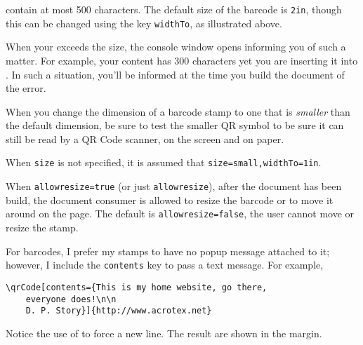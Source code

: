\documentclass{article}
\begin{document}
\begin{description}
\begin{itemize}
                contain at most 500
                characters.
                The default size of the barcode is
                \texttt{2in}, though this can be changed using
                the key \texttt{widthTo}, as illustrated above.
    \end{itemize}
    When your  exceeds the size, the console window opens
    informing you of such a matter. For example, your content has 300
    characters yet you are inserting it into
    . In such a situation, you'll be
    informed at the time you build the document of the error.

    When you change the dimension of a barcode stamp to one that is \emph{smaller}
    than the default dimension, be sure to test the smaller QR symbol to be
    sure it can still be read by a QR Code scanner, on the screen and on
    paper.

    When \texttt{size} is not specified, it is assumed that \texttt{size=small,widthTo=1in}.

    \item[\texttt{allowresize=true|false}] When \texttt{allowresize=true}
        (or just \texttt{allowresize}), after the document has been build,
        the document consumer is allowed to resize the barcode or to move
        it around on the page. The default is \texttt{allowresize=false},
        the user cannot move or resize the stamp.



\item[\texttt{contents=\ameta{text}}] For barcodes, I prefer my stamps to have no popup message
attached to it; however, I include the \texttt{contents} key to pass a text message. For example,
\begin{Verbatim}[xleftmargin=\amtIndent,fontsize=\normalsize]
\qrCode[contents={This is my home website, go there,
    everyone does!\n\n
    D. P. Story}]{http://www.acrotex.net}
\end{Verbatim}
Notice the use of  to force a new line. The result are shown in the margin.%
\end{description}
\end{document}
